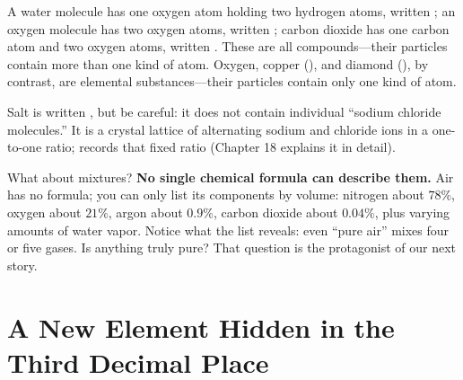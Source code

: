 A water molecule has one oxygen atom holding two hydrogen atoms, written ; an oxygen molecule has two oxygen atoms, written ; carbon dioxide has one carbon atom and two oxygen atoms, written . These are all compounds---their particles contain more than one kind of atom. Oxygen, copper (), and diamond (), by contrast, are elemental substances---their particles contain only one kind of atom.

Salt is written , but be careful: it does not contain individual ``sodium chloride molecules.'' It is a crystal lattice of alternating sodium and chloride ions in a one-to-one ratio;  records that fixed ratio (Chapter 18 explains it in detail).

What about mixtures? \textbf{No single chemical formula can describe them.} Air has no formula; you can only list its components by volume: nitrogen  about $78\%$, oxygen  about $21\%$, argon  about $0.9\%$, carbon dioxide  about $0.04\%$, plus varying amounts of water vapor. Notice what the list reveals: even ``pure air'' mixes four or five gases. Is anything truly pure? That question is the protagonist of our next story.

\section{A New Element Hidden in the Third Decimal Place}

